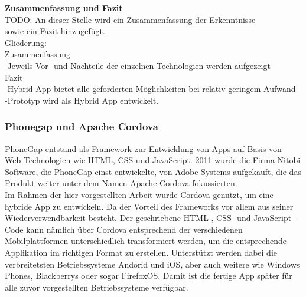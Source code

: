 \textbf{\underline{Zusammenfassung und Fazit}}\\





\underline{TODO: An dieser Stelle wird ein Zusammenfassung der Erkenntnisse }\\
\underline{sowie ein Fazit hinzugefügt.}
\\Gliederung:
\\Zusammenfassung
\\-Jeweils Vor- und Nachteile der einzelnen Technologien werden aufgezeigt
\\Fazit
\\-Hybrid App bietet alle geforderten Möglichkeiten bei relativ geringem Aufwand
\\-Prototyp wird als Hybrid App entwickelt.






\subsubsection{Phonegap und Apache Cordova}
PhoneGap entstand als Framework zur Entwicklung von Apps auf Basis von Web-Technologien wie HTML, CSS und JavaScript. 2011 wurde die Firma Nitobi Software, die PhoneGap einst entwickelte, von Adobe Systems aufgekauft, die das Produkt weiter unter dem Namen Apache Cordova fokussierten. 
\\
Im Rahmen der hier vorgestellten Arbeit wurde Cordova genutzt, um eine hybride App zu entwickeln. Da der Vorteil des Frameworks vor allem aus seiner Wiederverwendbarkeit besteht. Der geschriebene HTML-, CSS- und JavaScript-Code kann nämlich über Cordova entsprechend der verschiedenen Mobilplattformen unterschiedlich transformiert werden, um die entsprechende Applikation im richtigen Format zu erstellen. Unterstützt werden dabei die verbreitetsten Betriebssysteme Andorid und iOS, aber auch weitere wie Windows Phones, Blackberrys oder sogar FirefoxOS. Damit ist die fertige App später für alle zuvor vorgestellten Betriebssysteme verfügbar.



